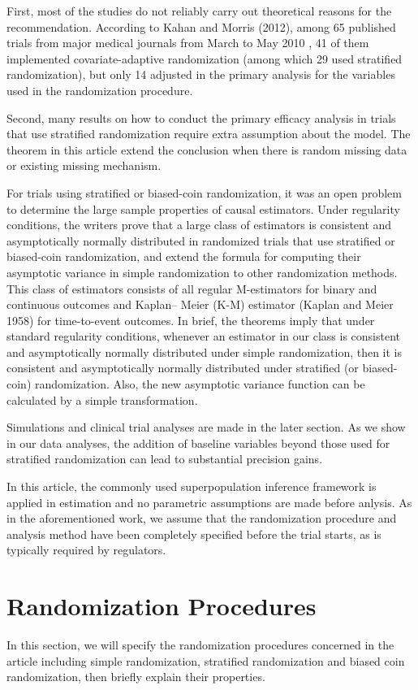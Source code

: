 \documentclass{article}
\begin{document}
First, most of the studies do not reliably carry out theoretical reasons for the recommendation. 
According to Kahan and Morris (2012)\cite{kahan2012improper}, among 65 published trials from major medical journals from March to May 2010 , 41 of them implemented covariate-adaptive randomization (among which 29 used stratified randomization), but only 14 adjusted in the primary analysis for the variables used in the randomization procedure.

Second, many results on how to conduct the primary efficacy analysis in trials that use stratified randomization require extra assumption about the model. 
The theorem in this article extend the conclusion when there is random missing data or existing missing mechanism.

For trials using stratified or biased-coin randomization, it was an open problem to determine the large sample properties of causal estimators. 
Under regularity conditions, the writers prove that a large class of estimators is consistent and asymptotically normally distributed in randomized trials that use stratified or biased-coin randomization, and extend the formula for computing their asymptotic variance in simple randomization to other randomization methods. 
This class of estimators consists of all regular M-estimators for binary and continuous outcomes and Kaplan– Meier (K-M) estimator (Kaplan and Meier 1958\cite{kaplan1958nonparametric}) for time-to-event outcomes.
In brief, the theorems imply that under standard regularity conditions, whenever an estimator in our class is consistent and asymptotically normally distributed under simple randomization, then it is consistent and asymptotically normally distributed under stratified (or biased-coin) randomization.
Also, the new asymptotic variance function can be calculated by a simple transformation.

Simulations and clinical trial analyses are made in the later section. 
As we show in our data analyses, the addition of baseline variables beyond those used for stratified randomization can lead to substantial precision gains.

In this article, the commonly used superpopulation inference framework is applied in estimation and no parametric assumptions are made before anlysis. As in the aforementioned work, we assume that the randomization procedure and analysis method have been completely specified before the trial starts, as is typically required by regulators.

\section{Randomization Procedures}
In this section, we will specify the randomization procedures concerned in the article including simple randomization, stratified randomization and biased coin randomization, then briefly explain their properties.
\end{document}
